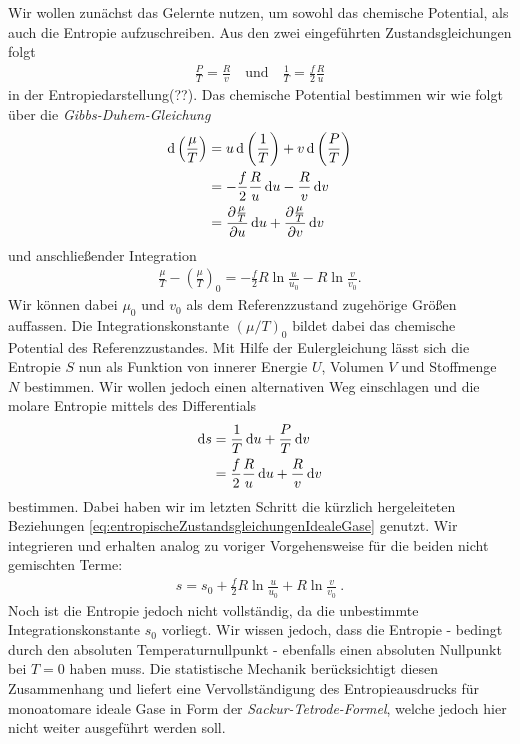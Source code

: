 Wir wollen zunächst das Gelernte nutzen, um sowohl das chemische Potential, als auch die Entropie aufzuschreiben. Aus den zwei eingeführten Zustandsgleichungen folgt 
\begin{align}
    \label{eq:entropischeZustandsgleichungenIdealeGase}
    \boxed{\frac{P}{T}=\frac{R}{v} \quad\text{und}\quad \frac{1}{T}=\frac{f}{2}\frac{R}{u}}
\end{align} 
in der Entropiedarstellung(??).
Das chemische Potential bestimmen wir wie folgt über die \emph{Gibbs-Duhem-Gleichung} 
\begin{align*}
    \mathop{}\!\mathrm{d} \left(\frac{\mu}{T}\right)&=u\mathop{}\!\mathrm{d}\left(\frac{1}{T}\right)+v\mathop{}\!\mathrm{d} \left(\frac{P}{T}\right)\\
    &=-\frac{f}{2}\frac{R}{u}\mathop{}\!\mathrm{d} u-\frac{R}{v}\mathop{}\!\mathrm{d} v\\
    &=\frac{\partial \frac{\mu}{T}}{\partial u}\mathop{}\!\mathrm{d} u+\frac{\partial \frac{\mu}{T}}{\partial v}\mathop{}\!\mathrm{d} v
\end{align*}  
und anschließender Integration 
\begin{align*}
    \frac{\mu}{T}-\left(\frac{\mu}{T}\right)_0=-\frac{f}{2}R\ln\frac{u}{u_0}-R\ln\frac{v}{v_0}.
\end{align*}
Wir können dabei $\mu_0$ und $v_0$ als dem Referenzzustand zugehörige Größen auffassen.
Die Integrationskonstante $(\mu/T)_0$ bildet dabei das chemische Potential des Referenzzustandes.
Mit Hilfe der Eulergleichung lässt sich die Entropie $S$ nun als Funktion von innerer Energie $U$, Volumen $V$ und Stoffmenge $N$ bestimmen. Wir wollen jedoch einen alternativen Weg einschlagen und die molare Entropie mittels des Differentials 
\begin{align*}
    \mathop{}\!\mathrm{d} s&=\frac{1}{T}\mathop{}\!\mathrm{d} u+\frac{P}{T}\mathop{}\!\mathrm{d} v\\
    &=\frac{f}{2}\frac{R}{u}\mathop{}\!\mathrm{d} u+\frac{R}{v}\mathop{}\!\mathrm{d} v    
\end{align*} 
bestimmen.
Dabei haben wir im letzten Schritt die kürzlich hergeleiteten Beziehungen \eqref{eq:entropischeZustandsgleichungenIdealeGase} genutzt.
Wir integrieren und erhalten analog zu voriger Vorgehensweise für die beiden nicht gemischten Terme: 
\begin{align*}
    \boxed{s=s_0+\frac{f}{2}R\ln\frac{u}{u_0}+R\ln\frac{v}{v_0}}\:.
\end{align*}
Noch ist die Entropie jedoch nicht vollständig, da die unbestimmte Integrationskonstante $s_0$ vorliegt. Wir wissen jedoch, dass die Entropie - bedingt durch den absoluten Temperaturnullpunkt - ebenfalls einen absoluten Nullpunkt bei $T=0$ haben muss. 
Die statistische Mechanik berücksichtigt diesen Zusammenhang und liefert eine Vervollständigung des Entropieausdrucks für monoatomare ideale Gase in Form der \emph{Sackur-Tetrode-Formel}, welche jedoch hier nicht weiter ausgeführt werden soll.

